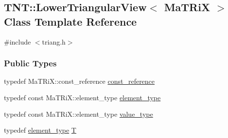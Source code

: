 \subsection{TNT::LowerTriangularView$<$ MaTRiX $>$ Class Template Reference}
\label{class_t_n_t_1_1_lower_triangular_view}


{\ttfamily \#include $<$triang.h$>$}

\subsubsection*{Public Types}
\begin{DoxyCompactItemize}
\item 
typedef MaTRiX::const\_\-reference \hyperlink{class_t_n_t_1_1_lower_triangular_view_a5f1897676c05bb6efef1010f32d507b9}{const\_\-reference}
\item 
typedef const MaTRiX::element\_\-type \hyperlink{class_t_n_t_1_1_lower_triangular_view_a70f2e8cbfb81cbc76c14a5f9b8361328}{element\_\-type}
\item 
typedef const MaTRiX::element\_\-type \hyperlink{class_t_n_t_1_1_lower_triangular_view_ac374b598b227e86d072228d84c6ae69d}{value\_\-type}
\item 
typedef \hyperlink{class_t_n_t_1_1_lower_triangular_view_a70f2e8cbfb81cbc76c14a5f9b8361328}{element\_\-type} \hyperlink{class_t_n_t_1_1_lower_triangular_view_aabf948f8d6e27ca08a3da0583a00c9b1}{T}
\end{DoxyCompactItemize}
